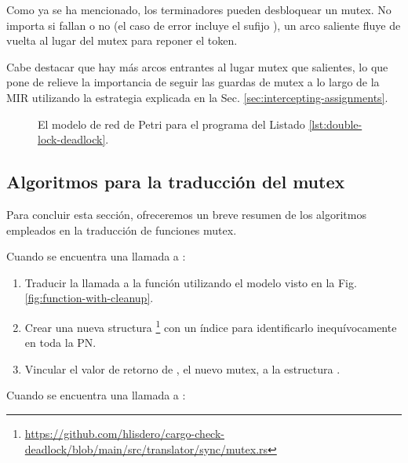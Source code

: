 Como ya se ha mencionado, los terminadores  pueden desbloquear un mutex.
No importa si fallan o no (el caso de error incluye el sufijo ),
un arco saliente fluye de vuelta al lugar del mutex para reponer el token.

Cabe destacar que hay más arcos entrantes al lugar mutex que salientes, lo que pone
de relieve la importancia de seguir las guardas de mutex a lo largo de la \acrshort{MIR} utilizando la
estrategia explicada en la Sec. \ref{sec:intercepting-assignments}.

\begin{figure}[!htbp]
      \centering
      
      \caption{El modelo de red de Petri para el programa del Listado \ref{lst:double-lock-deadlock}.}
      \label{fig:mutex-example}
\end{figure}

\subsection{Algoritmos para la traducción del mutex}
\label{sec:mutex-algorithms}

Para concluir esta sección, ofreceremos un breve resumen de los algoritmos empleados en la
traducción de funciones mutex.

Cuando se encuentra una llamada a :

\begin{enumerate}
      \item Traducir la llamada a la función utilizando el modelo visto en la Fig. \ref{fig:function-with-cleanup}.
      \item Crear una nueva structura \footnote{\url{https://github.com/hlisdero/cargo-check-deadlock/blob/main/src/translator/sync/mutex.rs}}
            con un índice para identificarlo inequívocamente en toda la \acrshort{PN}.
      \item Vincular el valor de retorno de ,
            el nuevo mutex, a la estructura .
\end{enumerate}

Cuando se encuentra una llamada a :

